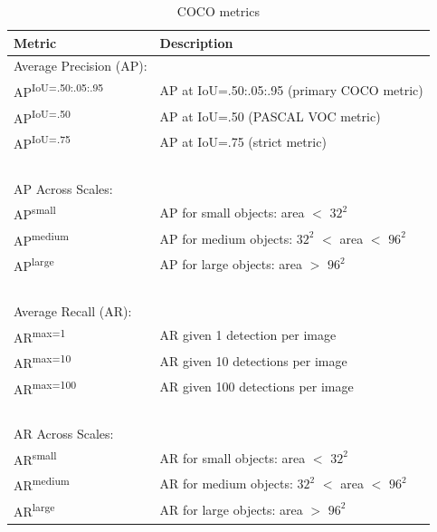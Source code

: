 \documentclass[report.tex]{subfiles}
\begin{document}
    \begin{table}[!ht]
        \centering
        \caption{COCO metrics \cite{lin2014microsoft}}
        \begin{tabular}{ll}
        \hline
            \textbf{Metric} & \textbf{Description} \\ \hline
            Average Precision (AP): & ~ \\ \hline
            AP\textsuperscript{IoU=.50:.05:.95} & AP at IoU=.50:.05:.95 (primary COCO metric) \\
            AP\textsuperscript{IoU=.50} & AP at IoU=.50 (PASCAL VOC metric) \\
            AP\textsuperscript{IoU=.75} & AP at IoU=.75 (strict metric) \\
            ~ & ~ \\ \hline
            AP Across Scales: & ~ \\ \hline
            AP\textsuperscript{small} & AP for small objects: area $<$ $32^2$ \\
            AP\textsuperscript{medium} & AP for medium objects: $32^2$ $<$ area $<$ $96^2$ \\
            AP\textsuperscript{large} & AP for large objects: area $>$ $96^2$ \\
            ~ & ~ \\ \hline
            Average Recall (AR): & ~ \\ \hline
            AR\textsuperscript{max=1} & AR given 1 detection per image \\ 
            AR\textsuperscript{max=10} & AR given 10 detections per image \\ 
            AR\textsuperscript{max=100} & AR given 100 detections per image \\ 
            ~ & ~ \\ \hline
            AR Across Scales: & ~ \\ \hline
            AR\textsuperscript{small} & AR for small objects: area $<$ $32^2$ \\
            AR\textsuperscript{medium} & AR for medium objects: $32^2$ $<$ area $<$ $96^2$ \\
            AR\textsuperscript{large} & AR for large objects: area $>$ $96^2$ \\
        \end{tabular}
        \label{tab:coco_metrics}
    \end{table}
\end{document}
